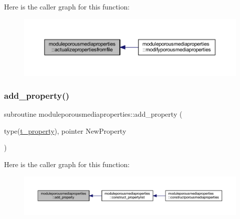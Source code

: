 Here is the caller graph for this function\+:\nopagebreak
\begin{figure}[H]
\begin{center}
\leavevmode
\includegraphics[width=350pt]{namespacemoduleporousmediaproperties_a34afbe14179f6a786f5504a52ce2d220_icgraph}
\end{center}
\end{figure}
\mbox{\label{namespacemoduleporousmediaproperties_a199bd8a8509f7ddd865f230c56680292}} 
\subsubsection{\texorpdfstring{add\+\_\+property()}{add\_property()}}
{\footnotesize\ttfamily subroutine moduleporousmediaproperties\+::add\+\_\+property (\begin{DoxyParamCaption}\item[{type(\mbox{\hyperlink{structmoduleporousmediaproperties_1_1t__property}{t\+\_\+property}}), pointer}]{New\+Property }\end{DoxyParamCaption})\hspace{0.3cm}{\ttfamily [private]}}

Here is the caller graph for this function\+:\nopagebreak
\begin{figure}[H]
\begin{center}
\leavevmode
\includegraphics[width=350pt]{namespacemoduleporousmediaproperties_a199bd8a8509f7ddd865f230c56680292_icgraph}
\end{center}
\end{figure}
\mbox{\label{namespacemoduleporousmediaproperties_a4a94ca075eedbc0f235c5c681470aee8}} 
